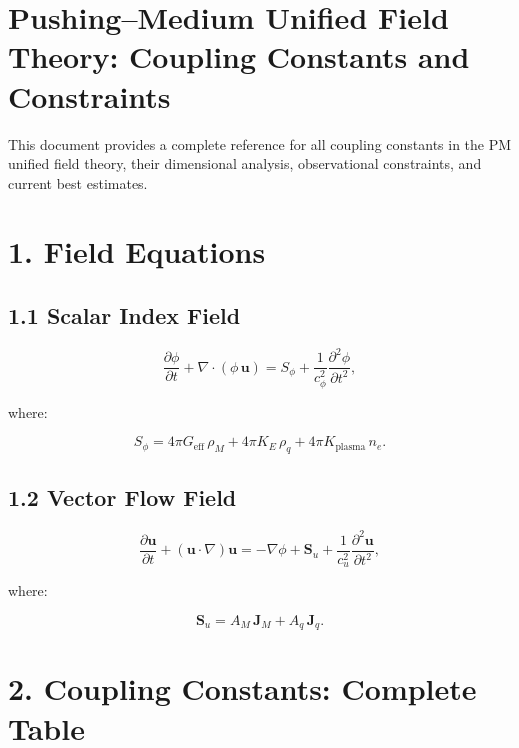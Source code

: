\documentclass{article}
\begin{document}
\section*{Pushing--Medium Unified Field Theory: Coupling Constants and Constraints}

This document provides a complete reference for all coupling constants in the PM
unified field theory, their dimensional analysis, observational constraints, and
current best estimates.

\section*{1. Field Equations}

\subsection*{1.1 Scalar Index Field}



\[
\frac{\partial \phi}{\partial t}
+ \nabla\cdot(\phi\,\mathbf u)
=
S_\phi
+ \frac{1}{c_\phi^2}\frac{\partial^2 \phi}{\partial t^2},
\]



where:



\[
S_\phi = 4\pi G_{\text{eff}}\,\rho_M
+ 4\pi K_E\,\rho_q
+ 4\pi K_{\text{plasma}}\,n_e.
\]



\subsection*{1.2 Vector Flow Field}



\[
\frac{\partial \mathbf u}{\partial t}
+ (\mathbf u\cdot\nabla)\mathbf u
=
-\nabla \phi
+ \mathbf S_u
+ \frac{1}{c_u^2}\frac{\partial^2 \mathbf u}{\partial t^2},
\]



where:



\[
\mathbf S_u = A_M\,\mathbf J_M + A_q\,\mathbf J_q.
\]



\section*{2. Coupling Constants: Complete Table}
\end{document}
